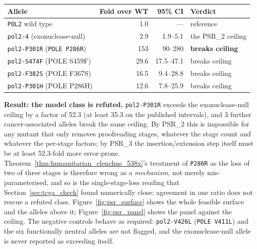 \documentclass[11pt,a4paper]{article}
\theoremstyle{definition}
\begin{document}
\begin{center}
\begin{tabular}{@{}lrrl@{}}
\toprule
Allele & Fold over WT & 95\% CI & Verdict \\
\midrule
\texttt{POL2} wild type & 1.0 & --- & reference \\
\texttt{pol2-4} (exonuclease-null) & 2.9 & 1.9--5.1 & the PSR\_2 ceiling \\
\texttt{pol2-P301R} (\texttt{POLE P286R}) & 153 & 90--280 & \textbf{breaks ceiling} \\
\texttt{pol2-S474F} (POLE S459F) & 29.6 & 17.5--47.1 & breaks ceiling \\
\texttt{pol2-F382S} (POLE F367S) & 16.5 & 9.4--28.8 & breaks ceiling \\
\texttt{pol2-P301H} (POLE P286H) & 12.6 & 7.8--25.9 & breaks ceiling \\
\bottomrule
\end{tabular}
\end{center}

\textbf{Result: the model class is refuted.} \texttt{pol2-P301R} exceeds the exonuclease-null
ceiling by a factor of 52.3 (at least 35.3 on the published intervals), and 3 further
cancer-associated alleles break the same ceiling. By PSR\_2 this is impossible for any mutant
that only removes proofreading stages, whatever the stage count and whatever the per-stage
factors; by PSR\_3 the insertion/extension step itself must be at least 52.3-fold more
error-prone. Theorem~\ref{thm:humanitarian_elenchus_538x}'s treatment of \texttt{P286R} as the
loss of two of three stages is therefore wrong as a \emph{mechanism}, not merely
mis-parameterised, and so is the single-stage-loss reading that Section~\ref{sec:tcga_check}
found numerically close: agreement in one ratio does not rescue a refuted class.
Figure~\ref{fig:psr_surface} shows the whole feasible surface and the alleles above it;
Figure~\ref{fig:psr_panel} shows the panel against the ceiling. The negative controls behave
as required: \texttt{pol2-V426L} (\texttt{POLE V411L}) and the six functionally neutral alleles
are not flagged, and the exonuclease-null allele is never reported as exceeding itself.
\end{document}

